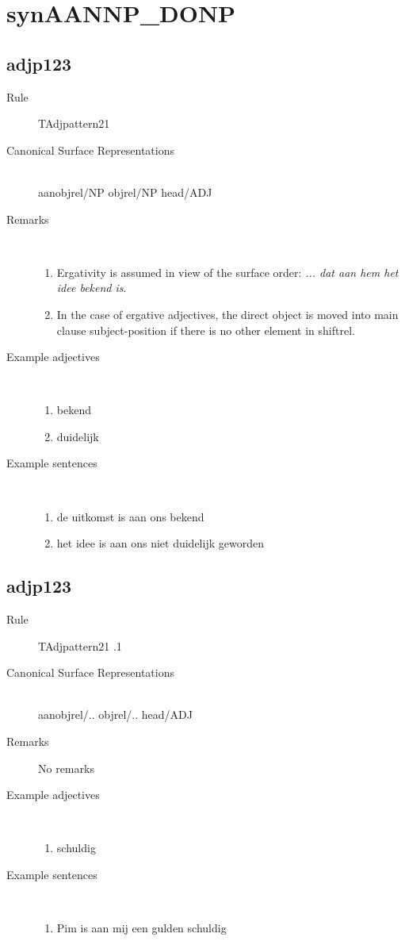 \section{synAANNP\_DONP}
\subsection{adjp123}
\begin{description}
  \item [Rule] TAdjpattern21
  \item [Canonical Surface Representations] 
 \mbox{}\\ aanobjrel/NP objrel/NP head/ADJ
  \item [Remarks] \mbox{}\\
\begin{enumerate}
  \item 
Ergativity is assumed 
in view of the surface order:
{\em ... dat aan hem het idee bekend is}.
  \item
In the case of ergative adjectives,
the direct object is moved into main clause subject-position if
there is no other element in shiftrel. 
\end{enumerate}

  \item [Example adjectives]\mbox{}\\
\begin{enumerate}
  \item bekend 
  \item duidelijk
\end{enumerate}
  \item [Example sentences]\mbox{}\\
\begin{enumerate}
  \item de uitkomst is aan ons bekend
  \item het idee  is aan ons niet duidelijk geworden
\end{enumerate}
\end{description}
\subsection{adjp123}
\begin{description}
  \item [Rule] TAdjpattern21 .1
  \item [Canonical Surface Representations]  \mbox{}\\
aanobjrel/.. objrel/.. head/ADJ
  \item [Remarks] No remarks

  \item [Example adjectives]\mbox{}\\
\begin{enumerate}
  \item schuldig
\end{enumerate}
  \item [Example sentences]\mbox{}\\
\begin{enumerate}
  \item Pim is aan mij een gulden schuldig
\end{enumerate}
\end{description}
\newpage
